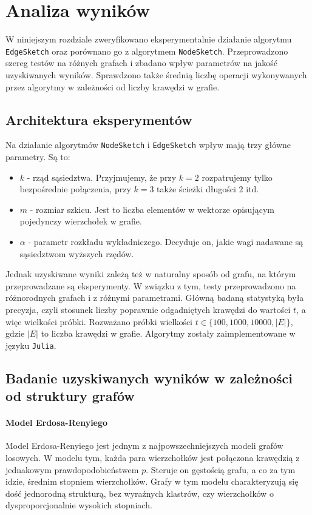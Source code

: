 \chapter{Analiza wyników}

    W niniejszym rozdziale zweryfikowano eksperymentalnie działanie algorytmu \texttt{EdgeSketch} oraz porównano go z algorytmem \texttt{NodeSketch}. Przeprowadzono szereg testów na różnych grafach i zbadano wpływ parametrów na jakość uzyskiwanych wyników. Sprawdzono także średnią liczbę operacji wykonywanych przez algorytmy w zależności od liczby krawędzi w grafie.

\section{Architektura eksperymentów}

    Na działanie algorytmów \texttt{NodeSketch} i \texttt{EdgeSketch} wpływ mają trzy główne parametry. Są to:
    \begin{itemize}
        \item $k$ - rząd sąsiedztwa. Przyjmujemy, że przy $k = 2$ rozpatrujemy tylko bezpośrednie połączenia, przy $k = 3$ także ścieżki długości $2$ itd. 
        \item $m$ - rozmiar szkicu. Jest to liczba elementów w wektorze opisującym pojedynczy wierzchołek w grafie. 
        \item $\alpha$ - parametr rozkładu wykładniczego. Decyduje on, jakie wagi nadawane są sąsiedztwom wyższych rzędów.
    \end{itemize}

    Jednak uzyskiwane wyniki zależą też w naturalny sposób od grafu, na którym przeprowadzane są eksperymenty. W związku z tym, testy przeprowadzono na różnorodnych grafach i z różnymi parametrami. Główną badaną statystyką była precyzja, czyli stosunek liczby poprawnie odgadniętych krawędzi do wartości $t$, a więc wielkości próbki. Rozważano próbki wielkości $t \in \{100, 1000, 10000, |E|\}$, gdzie $|E|$ to liczba krawędzi w grafie. Algorytmy zostały zaimplementowane w języku \texttt{Julia}\cite{Julia}.

\section{Badanie uzyskiwanych wyników w zależności od struktury grafów}

    \subsubsection{Model Erdosa-Renyiego}
        Model Erdosa-Renyiego jest jednym z najpowszechniejszych modeli grafów losowych. W modelu tym, każda para wierzchołków jest połączona krawędzią z jednakowym prawdopodobieństwem $p$. Steruje on gęstością grafu, a co za tym idzie, średnim stopniem wierzchołków. Grafy w tym modelu charakteryzują się dość jednorodną strukturą, bez wyraźnych klastrów, czy wierzchołków o dysproporcjonalnie wysokich stopniach. 

